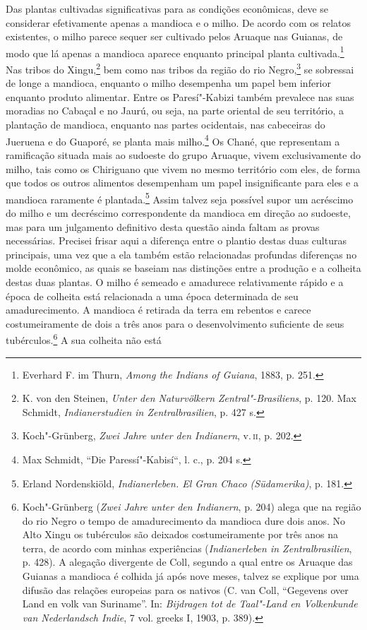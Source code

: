 Das plantas cultivadas significativas para as condições econômicas, deve
se considerar efetivamente apenas a mandioca e o milho. De acordo com
os relatos existentes, o milho parece sequer ser cultivado pelos Aruaque
nas Guianas, de modo que lá apenas a mandioca aparece enquanto principal
planta cultivada.\footnote{Everhard F. im Thurn, \emph{Among the Indians
  of Guiana}, 1883, p. 251.} Nas tribos do Xingu,\footnote{K. von den
  Steinen, \emph{Unter den Naturvölkern Zentral"-Brasiliens}, p. 120. Max
  Schmidt, \emph{Indianerstudien in Zentralbrasilien}, p. 427 s.} bem
como nas tribos da região do rio Negro,\footnote{Koch"-Grünberg,
  \emph{Zwei Jahre unter den Indianern}, v.\,\textsc{ii}, p. 202.} se sobressai
de longe a mandioca, enquanto o milho desempenha um papel bem inferior
enquanto produto alimentar. Entre os Paresí"-Kabizi também prevalece nas
suas moradias no Cabaçal e no Jaurú, ou seja, na parte oriental de seu
território, a plantação de mandioca, enquanto nas partes ocidentais, nas
cabeceiras do Jueruena e do Guaporé, se planta mais milho.\footnote{Max
  Schmidt, ``Die Paressí"-Kabisí``, l. c., p. 204 s.} Os Chané, que
representam a ramificação situada mais ao sudoeste do grupo Aruaque,
vivem exclusivamente do milho, tais como os Chiriguano que vivem no
mesmo território com eles, de forma que todos os outros alimentos
desempenham um papel insignificante para eles e a mandioca raramente é
plantada.\footnote{Erland Nordenskiöld, \emph{Indianerleben. El Gran
  Chaco (Südamerika)}, p. 181.} Assim talvez seja possível supor um
acréscimo do milho e um decréscimo correspondente da mandioca em direção
ao sudoeste, mas para um julgamento definitivo desta questão ainda
faltam as provas necessárias. Precisei frisar aqui a diferença entre o
plantio destas duas culturas principais, uma vez que a ela também estão
relacionadas profundas diferenças no molde econômico, as quais se
baseiam nas distinções entre a produção e a colheita destas duas
plantas. O milho é semeado e amadurece relativamente rápido e a época de
colheita está relacionada a uma época determinada de seu amadurecimento.
A mandioca é retirada da terra em rebentos e carece costumeiramente de
dois a três anos para o desenvolvimento suficiente de seus
tubérculos.\footnote{Koch"-Grünberg (\emph{Zwei Jahre unter den
  Indianern}, p. 204) alega que na região do rio Negro o tempo de
  amadurecimento da mandioca dure dois anos. No Alto Xingu os tubérculos
  são deixados costumeiramente por três anos na terra, de acordo com
  minhas experiências (\emph{Indianerleben in Zentralbrasilien}, p.
  428). A alegação divergente de Coll, segundo a qual entre os Aruaque
  das Guianas a mandioca é colhida já após nove meses, talvez se
  explique por uma difusão das relações europeias para os nativos (C.
  van Coll, ``Gegevens over Land en volk van Suriname''. In:
  \emph{Bijdragen tot de Taal"-Land en Volkenkunde van Nederlandsch
  Indie}, 7 vol. greeks I, 1903, p. 389).} A sua colheita não está
